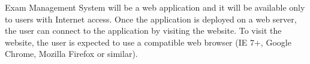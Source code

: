 
Exam Management System will be a web application and it will be available only to users with Internet access. 
Once the application is deployed on a web server, the user can connect to the application by visiting the website. 
To visit the website, the user is expected to use a compatible web browser (IE 7+, Google Chrome, Mozilla Firefox or similar).
